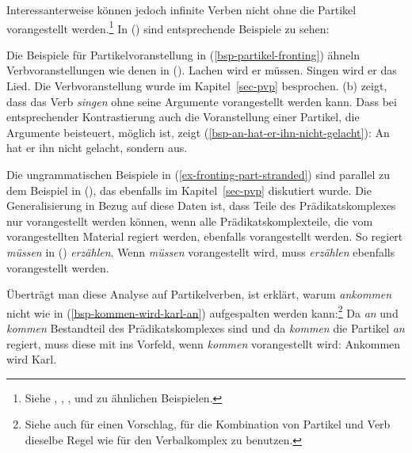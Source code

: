 Interessanterweise können jedoch infinite Verben nicht ohne die Partikel vorangestellt werden.\footnote{
        Siehe , , , %
         und  zu ähnlichen Beispielen.
}
In () sind entsprechende Beispiele zu sehen:
\eal
\label{ex-fronting-part-stranded}
\zl

\noindent
Die Beispiele für Partikelvoranstellung in (\ref{bsp-partikel-fronting}) ähneln Verbvoranstellungen wie denen in ().
\eal
\ex Lachen wird er müssen.
\ex Singen wird er das Lied.
\zl
Die Verbvoranstellung wurde im Kapitel~\ref{sec-pvp} besprochen. (b) zeigt,
dass das Verb \emph{singen} ohne seine Argumente vorangestellt werden kann.
Dass bei entsprechender Kontrastierung auch die Voranstellung einer Partikel,
die Argumente beisteuert, möglich ist, zeigt (\ref{bsp-an-hat-er-ihn-nicht-gelacht}):
\ea
\label{bsp-an-hat-er-ihn-nicht-gelacht}
An hat er ihn nicht gelacht, sondern aus.
\z

\noindent
Die ungrammatischen Beispiele in (\ref{ex-fronting-part-stranded}) sind
parallel zu dem Beispiel in (), das ebenfalls im Kapitel~\ref{sec-pvp}
diskutiert wurde.
\label{ex-muessen-wird-er-ihr-zwei}
\z
Die Generalisierung in Bezug auf diese Daten ist, dass Teile des Prädikatskomplexes
nur vorangestellt werden können, wenn alle Prädikatskomplexteile, die vom vorangestellten
Material regiert werden, ebenfalls vorangestellt werden.
So regiert \zb \emph{müssen} in () \emph{erzählen}.
Wenn \emph{müssen} vorangestellt wird, muss \emph{erzählen} ebenfalls vorangestellt werden.

Überträgt man diese Analyse auf Partikelverben, ist erklärt, warum \zb \emph{ankommen}
nicht wie in (\ref{bsp-kommen-wird-karl-an}) aufgespalten werden kann:\footnote{
  Siehe auch  für einen Vorschlag, für die
  Kombination von Partikel und Verb dieselbe Regel wie für den Verbalkomplex zu benutzen.%
}
Da \emph{an} und \emph{kommen}
Bestandteil des Prädikatskomplexes sind und da \emph{kommen} die Partikel \emph{an} regiert,
muss diese mit ins Vorfeld, wenn \emph{kommen} vorangestellt wird:
\ea
Ankommen wird Karl.
\z
{}



